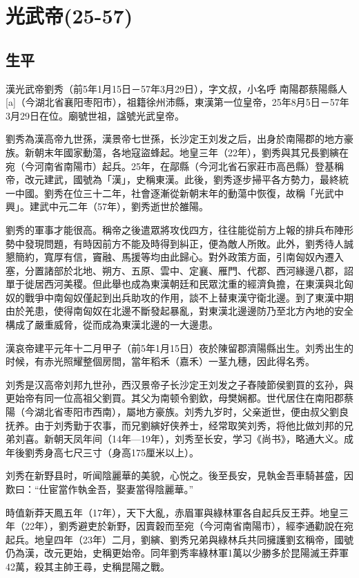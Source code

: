 
\section{光武帝\tiny(25-57)}

\subsection{生平}

漢光武帝劉秀（前5年1月15日－57年3月29日），字文叔，小名呼 南陽郡蔡陽縣人[a]（今湖北省襄阳枣阳市），祖籍徐州沛縣，東漢第一位皇帝，25年8月5日－57年3月29日在位。廟號世祖，諡號光武皇帝。

劉秀為漢高帝九世孫，漢景帝七世孫，长沙定王刘发之后，出身於南陽郡的地方豪族。新朝末年國家動蕩，各地寇盜蜂起。地皇三年（22年），劉秀與其兄長劉縯在宛（今河南省南陽市）起兵。25年，在鄗縣（今河北省石家莊市高邑縣）登基稱帝，改元建武，國號為「漢」，史稱東漢。此後，劉秀逐步掃平各方勢力，最終統一中國。劉秀在位三十二年，社會逐漸從新朝末年的動蕩中恢復，故稱「光武中興」。建武中元二年（57年），劉秀逝世於雒陽。

劉秀的軍事才能很高。稱帝之後遣眾將攻伐四方，往往能從前方上報的排兵布陣形勢中發現問題，有時因前方不能及時得到糾正，便為敵人所敗。此外，劉秀待人誠懇簡約，寬厚有信，竇融、馬援等均由此歸心。對外政策方面，引南匈奴內遷入塞，分置諸部於北地、朔方、五原、雲中、定襄、雁門、代郡、西河緣邊八郡，詔單于徙居西河美稷。但此舉也成為東漢朝廷和民眾沈重的經濟負擔，在東漢與北匈奴的戰爭中南匈奴僅起到出兵助攻的作用，談不上替東漢守衛北邊。到了東漢中期由於羌患，使得南匈奴在北邊不斷發起暴亂，對東漢北邊邊防乃至北方內地的安全構成了嚴重威脅，從而成為東漢北邊的一大邊患。

漢哀帝建平元年十二月甲子（前5年1月15日）夜於陳留郡濟陽縣出生。刘秀出生的时候，有赤光照耀整個房間，當年稻禾（嘉禾）一茎九穗，因此得名秀。

刘秀是汉高帝刘邦九世孙，西汉景帝子长沙定王刘发之子舂陵節侯劉買的玄孙，與更始帝有同一位高祖父劉買。其父为南顿令劉欽，母樊娴都。世代居住在南阳郡蔡陽（今湖北省枣阳市西南），屬地方豪族。刘秀九岁时，父亲逝世，便由叔父劉良抚养。由于刘秀勤于农事，而兄劉縯好侠养士，经常取笑刘秀，将他比做刘邦的兄弟刘喜。新朝天凤年间（14年—19年），刘秀至长安，学习《尚书》，略通大义。成年後劉秀身高七尺三寸（身高175厘米以上）。

刘秀在新野县时，听闻陰麗華的美貌，心悦之。後至長安，見執金吾車騎甚盛，因歎曰：“仕宦當作執金吾，娶妻當得陰麗華。”

時值新莽天鳳五年（17年），天下大亂，赤眉軍與綠林軍各自起兵反王莽。地皇三年（22年），劉秀避吏於新野，因賣穀而至宛（今河南省南陽市），經李通勸說在宛起兵。地皇四年（23年）二月，劉縯、劉秀兄弟與綠林兵共同擁護劉玄稱帝，國號仍為漢，改元更始，史稱更始帝。同年劉秀率綠林軍1萬以少勝多於昆陽滅王莽軍42萬，殺其主帥王尋，史稱昆陽之戰。

